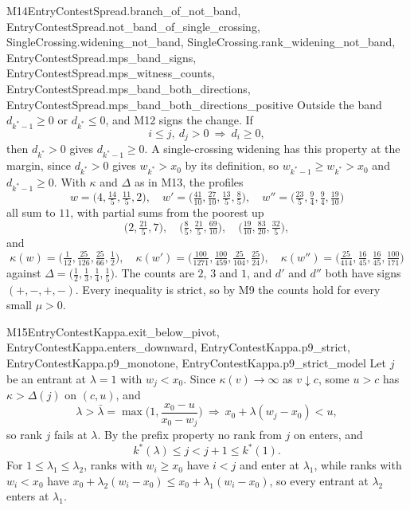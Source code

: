 \begin{mproof}{M14}{EntryContestSpread.branch_of_not_band, EntryContestSpread.not_band_of_single_crossing, SingleCrossing.widening_not_band, SingleCrossing.rank_widening_not_band, EntryContestSpread.mps_band_signs, EntryContestSpread.mps_witness_counts, EntryContestSpread.mps_band_both_directions, EntryContestSpread.mps_band_both_directions_positive}
Outside the band $d_{k^*-1}\ge0$ or $d_{k^*}\le0$, and M12 signs the change. If
\[
  i\le j,\ d_j>0\ \Rightarrow\ d_i\ge0,
\]
then $d_{k^*}>0$ gives $d_{k^*-1}\ge0$. A single-crossing widening has this
property at the margin, since $d_{k^*}>0$ gives $w_{k^*}>x_0$ by its definition, so
$w_{k^*-1}\ge w_{k^*}>x_0$ and $d_{k^*-1}\ge0$. With $\kappa$ and $\Delta$ as
in M13, the profiles
\[
  w=\big(4,\tfrac{14}{5},\tfrac{11}{5},2\big),\quad
  w'=\big(\tfrac{41}{10},\tfrac{27}{10},\tfrac{13}{5},\tfrac85\big),\quad
  w''=\big(\tfrac{23}5,\tfrac94,\tfrac94,\tfrac{19}{10}\big)
\]
all sum to $11$, with partial sums from the poorest up
\[
  \big(2,\tfrac{21}5,7\big),\quad
  \big(\tfrac85,\tfrac{21}5,\tfrac{69}{10}\big),\quad
  \big(\tfrac{19}{10},\tfrac{83}{20},\tfrac{32}5\big),
\]
and
\[
  \kappa(w)=\big(\tfrac1{12},\tfrac{25}{126},\tfrac{25}{66},\tfrac12\big),\quad
  \kappa(w')=\big(\tfrac{100}{1271},\tfrac{100}{459},\tfrac{25}{104},\tfrac{25}{24}\big),\quad
  \kappa(w'')=\big(\tfrac{25}{414},\tfrac{16}{45},\tfrac{16}{45},\tfrac{100}{171}\big)
\]
against $\Delta=\big(\tfrac12,\tfrac13,\tfrac14,\tfrac15\big)$. The counts are
$2$, $3$ and $1$, and $d'$ and $d''$ both have signs $(+,-,+,-)$. Every
inequality is strict, so by M9 the counts hold for every small $\mu>0$.
\end{mproof}

\begin{mproof}{M15}{EntryContestKappa.exit_below_pivot, EntryContestKappa.enters_downward, EntryContestKappa.p9_strict, EntryContestKappa.p9_monotone, EntryContestKappa.p9_strict_model}
Let $j$ be an entrant at $\lambda=1$ with $w_j<x_0$. Since $\kappa(v)\to\infty$ as
$v\downarrow c$, some $u>c$ has $\kappa>\Delta(j)$ on $(c,u)$, and
\[
  \lambda>\bar\lambda=\max\Big(1,\frac{x_0-u}{x_0-w_j}\Big)
  \ \Rightarrow\ x_0+\lambda(w_j-x_0)<u ,
\]
so rank $j$ fails at $\lambda$. By the prefix property no rank from $j$ on
enters, and
\[
  k^*(\lambda)\le j<j+1\le k^*(1).
\]
For $1\le\lambda_1\le\lambda_2$, ranks with $w_i\ge x_0$ have $i<j$ and enter at
$\lambda_1$, while ranks with $w_i<x_0$ have
$x_0+\lambda_2(w_i-x_0)\le x_0+\lambda_1(w_i-x_0)$, so every entrant at
$\lambda_2$ enters at $\lambda_1$.
\end{mproof}

